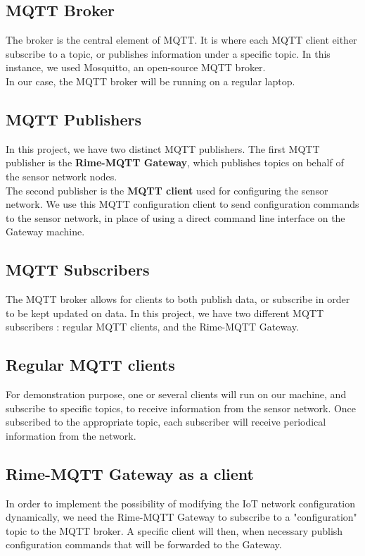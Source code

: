 \documentclass[a4paper,11pt]{article}
\begin{document}
\subsection{MQTT Broker}
The broker is the central element of MQTT. It is where each MQTT client either subscribe to a topic, or publishes information under a specific topic. In this instance, we used Mosquitto, an open-source MQTT broker.\\

In our case, the MQTT broker will be running on a regular laptop.


\subsection{MQTT Publishers}
In this project, we have two distinct MQTT publishers. The first MQTT publisher is the \textbf{Rime-MQTT Gateway}, which publishes topics on behalf of the sensor network nodes.\\

The second publisher is the \textbf{MQTT client} used for configuring the sensor network. We use this MQTT configuration client to send configuration commands to the sensor network, in place of using a direct command line interface on the Gateway machine.

\subsection{MQTT Subscribers}
The MQTT broker allows for clients to both publish data, or subscribe in order to be kept updated on data. In this project, we have two different MQTT subscribers : regular MQTT clients, and the Rime-MQTT Gateway.

\subsection{Regular MQTT clients}
For demonstration purpose, one or several clients will run on our machine, and subscribe to specific topics, to receive information from the sensor network. Once subscribed to the appropriate topic, each subscriber will receive periodical information from the network.

\subsection{Rime-MQTT Gateway as a client}
In order to implement the possibility of modifying the IoT network configuration dynamically, we need the Rime-MQTT Gateway to subscribe to a "configuration" topic to the MQTT broker. A specific client will then, when necessary publish configuration commands that will be forwarded to the Gateway.
\end{document}

